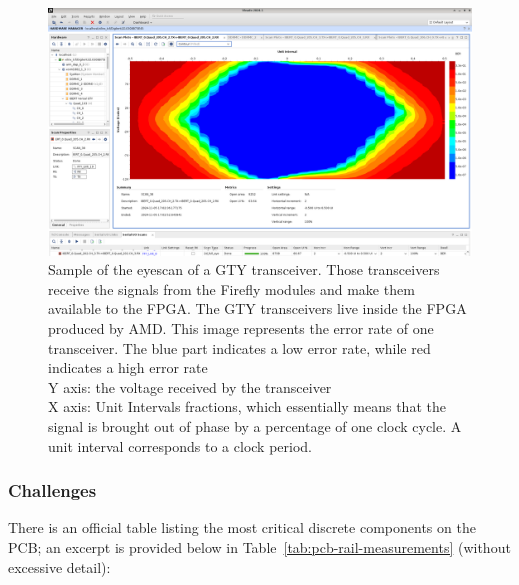 \begin{figure}[H]
\centering
\includegraphics[width=\textwidth]{images/contributions/eyescan.png}
\caption[Sample of the eyescan of a GTY transceiver]{Sample of the eyescan of a GTY transceiver. Those transceivers receive the signals from the Firefly \protect\cite{firefly-optical-transceiver} modules and make them available to the FPGA. The GTY transceivers live inside the FPGA produced by AMD. This image represents the error rate of one transceiver. The blue part indicates a low error rate, while red indicates a high error rate\\
Y axis: the voltage received by the transceiver\\
X axis: Unit Intervals fractions, which essentially means that the signal is brought out of phase by a percentage of one clock cycle. A unit interval corresponds to a clock period.}
\label{fig:eyescan-test}
\end{figure}

\clearpage
\subsubsection{Challenges}

There is an official table listing the most critical discrete components on the \ac{PCB}; an excerpt is provided below in Table~\ref{tab:pcb-rail-measurements} (without excessive detail):

